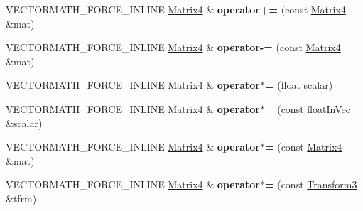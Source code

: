 \begin{DoxyCompactItemize}
\item 
\mbox{\label{classVectormath_1_1Aos_1_1Matrix4_ae838f4db3f02b98435768cc5a4f9b857}} 
V\+E\+C\+T\+O\+R\+M\+A\+T\+H\+\_\+\+F\+O\+R\+C\+E\+\_\+\+I\+N\+L\+I\+NE \hyperlink{classVectormath_1_1Aos_1_1Matrix4}{Matrix4} \& {\bfseries operator+=} (const \hyperlink{classVectormath_1_1Aos_1_1Matrix4}{Matrix4} \&mat)
\item 
\mbox{\label{classVectormath_1_1Aos_1_1Matrix4_a49551bcb4b568c7716133e30906336bd}} 
V\+E\+C\+T\+O\+R\+M\+A\+T\+H\+\_\+\+F\+O\+R\+C\+E\+\_\+\+I\+N\+L\+I\+NE \hyperlink{classVectormath_1_1Aos_1_1Matrix4}{Matrix4} \& {\bfseries operator-\/=} (const \hyperlink{classVectormath_1_1Aos_1_1Matrix4}{Matrix4} \&mat)
\item 
\mbox{\label{classVectormath_1_1Aos_1_1Matrix4_a718608f1c2af046b99b6f7d376b9517a}} 
V\+E\+C\+T\+O\+R\+M\+A\+T\+H\+\_\+\+F\+O\+R\+C\+E\+\_\+\+I\+N\+L\+I\+NE \hyperlink{classVectormath_1_1Aos_1_1Matrix4}{Matrix4} \& {\bfseries operator$\ast$=} (float scalar)
\item 
\mbox{\label{classVectormath_1_1Aos_1_1Matrix4_a850fc92e6d690f7e0ec7d71db84de9a5}} 
V\+E\+C\+T\+O\+R\+M\+A\+T\+H\+\_\+\+F\+O\+R\+C\+E\+\_\+\+I\+N\+L\+I\+NE \hyperlink{classVectormath_1_1Aos_1_1Matrix4}{Matrix4} \& {\bfseries operator$\ast$=} (const \hyperlink{classVectormath_1_1floatInVec}{float\+In\+Vec} \&scalar)
\item 
\mbox{\label{classVectormath_1_1Aos_1_1Matrix4_afecea56563bfecaa57607e583f344ff5}} 
V\+E\+C\+T\+O\+R\+M\+A\+T\+H\+\_\+\+F\+O\+R\+C\+E\+\_\+\+I\+N\+L\+I\+NE \hyperlink{classVectormath_1_1Aos_1_1Matrix4}{Matrix4} \& {\bfseries operator$\ast$=} (const \hyperlink{classVectormath_1_1Aos_1_1Matrix4}{Matrix4} \&mat)
\item 
\mbox{\label{classVectormath_1_1Aos_1_1Matrix4_aef527a3bf6a07c72e7b0e39bf2f6360a}} 
V\+E\+C\+T\+O\+R\+M\+A\+T\+H\+\_\+\+F\+O\+R\+C\+E\+\_\+\+I\+N\+L\+I\+NE \hyperlink{classVectormath_1_1Aos_1_1Matrix4}{Matrix4} \& {\bfseries operator$\ast$=} (const \hyperlink{classVectormath_1_1Aos_1_1Transform3}{Transform3} \&tfrm)
\end{DoxyCompactItemize}
